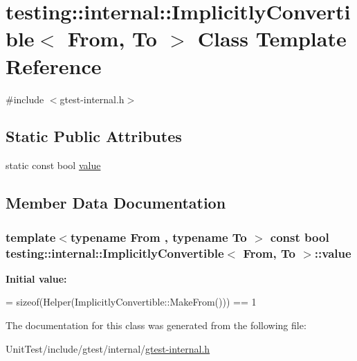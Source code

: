 \hypertarget{classtesting_1_1internal_1_1_implicitly_convertible}{\section{testing\+:\+:internal\+:\+:Implicitly\+Convertible$<$ From, To $>$ Class Template Reference}
\label{classtesting_1_1internal_1_1_implicitly_convertible}
}


{\ttfamily \#include $<$gtest-\/internal.\+h$>$}

\subsection*{Static Public Attributes}
\begin{DoxyCompactItemize}
\item 
static const bool \hyperlink{classtesting_1_1internal_1_1_implicitly_convertible_aea51cecabca681fb75659e224771b7b7}{value}
\end{DoxyCompactItemize}


\subsection{Member Data Documentation}
\hypertarget{classtesting_1_1internal_1_1_implicitly_convertible_aea51cecabca681fb75659e224771b7b7}{
\subsubsection[{value}]{\setlength{\rightskip}{0pt plus 5cm}template$<$typename From , typename To $>$ const bool {\bf testing\+::internal\+::\+Implicitly\+Convertible}$<$ From, To $>$\+::value\hspace{0.3cm}{\ttfamily [static]}}}\label{classtesting_1_1internal_1_1_implicitly_convertible_aea51cecabca681fb75659e224771b7b7}
{\bfseries Initial value\+:}
\begin{DoxyCode}
=
      \textcolor{keyword}{sizeof}(Helper(ImplicitlyConvertible::MakeFrom())) == 1
\end{DoxyCode}


The documentation for this class was generated from the following file\+:\begin{DoxyCompactItemize}
\item 
Unit\+Test/include/gtest/internal/\hyperlink{gtest-internal_8h}{gtest-\/internal.\+h}\end{DoxyCompactItemize}
